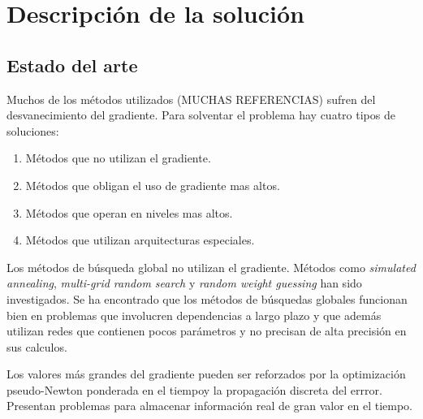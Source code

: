 \section{Descripción de la solución}
\begin{comment}
En la presente sección se describe el estado del arte y las características de la solución. Se explicara cual es el propósito de la solución, y posteriormente los alcances y limitaciones establecidas.
\end{comment}

\subsection{Estado del arte}
Muchos de los métodos utilizados (MUCHAS REFERENCIAS) sufren del desvanecimiento del gradiente. Para solventar el problema hay cuatro tipos de soluciones:
\begin{enumerate}
	\item Métodos que no utilizan el gradiente.
	\item Métodos que obligan el uso de gradiente mas altos.
	\item Métodos que operan en niveles mas altos.
	\item Métodos que utilizan arquitecturas especiales.
\end{enumerate}

Los métodos de búsqueda global no utilizan el gradiente. Métodos como {\em simulated annealing}, {\em multi-grid random search} \cite{Bengio1994} y {\em random weight guessing} \cite{Schmidhuber1996} han sido investigados. Se ha encontrado que los métodos de búsquedas globales funcionan bien en problemas que involucren dependencias a largo plazo y que además utilizan redes que contienen pocos parámetros y no precisan de alta precisión en sus calculos.

Los valores más grandes del gradiente pueden ser reforzados por la optimización pseudo-Newton ponderada en el tiempoy la propagación discreta del errror. Presentan problemas para almacenar información real de gran valor en el tiempo.





